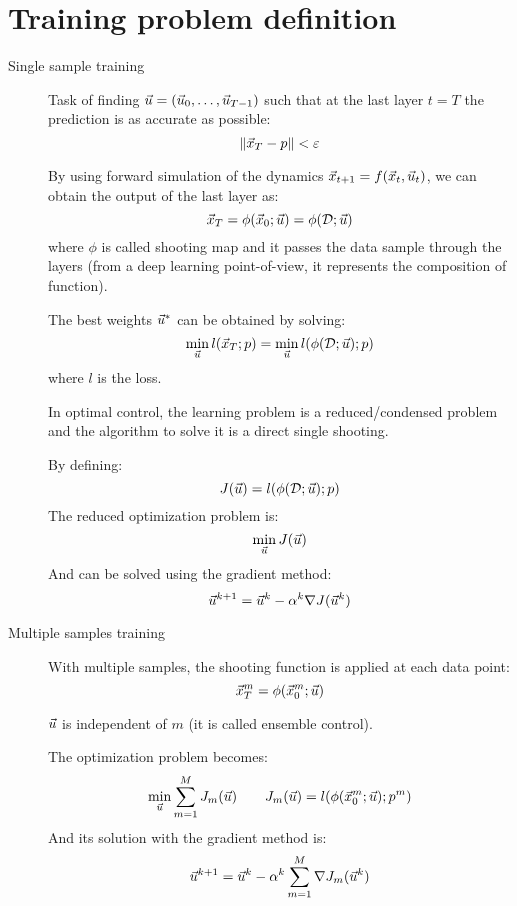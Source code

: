 


\section{Training problem definition}

\begin{description}
    \item[Single sample training] 
        Task of finding ${\vec{u}} = ({\vec{u}}_0, \dots, {\vec{u}}_{T-1})$ such that at the last layer $t=T$ the prediction is as accurate as possible:
        \[ \Vert {\vec{x}}_T - p \Vert < \varepsilon \]

        By using forward simulation of the dynamics ${\vec{x}}_{t+1} = f({\vec{x}}_t, {\vec{u}}_t)$, we can obtain the output of the last layer as:
        \[
            {\vec{x}}_T = \phi({\vec{x}}_0; {\vec{u}}) = \phi(\mathcal{D}; {\vec{u}})
        \]
        where $\phi$ is called shooting map and it passes the data sample through the layers (from a deep learning point-of-view, it represents the composition of function).

        The best weights ${\vec{u}}^*$ can be obtained by solving:
        \[
            \min_{{\vec{u}}} l({\vec{x}}_T; p) = \min_{{\vec{u}}} l(\phi(\mathcal{D}; {\vec{u}}); p)
        \]
        where $l$ is the loss.

        \begin{remark}
            In optimal control, the learning problem is a reduced/condensed problem and the algorithm to solve it is a direct single shooting.
        \end{remark}

        By defining:
        \[
            J({\vec{u}}) = l(\phi(\mathcal{D}; {\vec{u}}); p)
        \]
        The reduced optimization problem is:
        \[
            \min_{{\vec{u}}} J({\vec{u}})
        \]
        And can be solved using the gradient method:
        \[
            {\vec{u}}^{k+1} = {\vec{u}}^k - \alpha^k \nabla J({\vec{u}}^k)
        \]


    \item[Multiple samples training] 
        With multiple samples, the shooting function is applied at each data point:    
        \[
            {\vec{x}}_T^m = \phi({\vec{x}}_0^m; {\vec{u}})
        \]

        \begin{remark}
            ${\vec{u}}$ is independent of $m$ (it is called ensemble control).
        \end{remark}

        The optimization problem becomes:
        \[
            \min_{{\vec{u}}} \sum_{m=1}^{M} J_m({\vec{u}})
            \qquad 
            J_m({\vec{u}}) = l(\phi({\vec{x}}_0^m; {\vec{u}}); p^m)
        \]
        And its solution with the gradient method is:
        \[
            {\vec{u}}^{k+1} = {\vec{u}}^k - \alpha^k \sum_{m=1}^{M} \nabla J_m({\vec{u}}^k)
        \]
\end{description}


